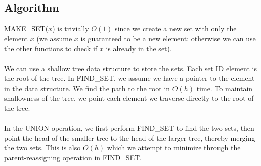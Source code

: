 \documentclass{article}
\begin{document}
\subsection*{Algorithm}
MAKE\_SET($x$) is trivially $O(1)$ since we create a new set with only the element $x$ (we assume $x$ is guaranteed to be a new element; otherwise we can use the other functions to check if $x$ is already in the set).\\
\\
We can use a shallow tree data structure to store the sets. Each set ID element is the root of the tree. In FIND\_SET, we assume we have a pointer to the element in the data structure. We find the path to the root in $O(h)$ time. To maintain shallowness of the tree, we point each element we traverse directly to the root of the tree.\\
\\
In the UNION operation, we first perform FIND\_SET to find the two sets, then point the head of the smaller tree to the head of the larger tree, thereby merging the two sets. This is also $O(h)$ which we attempt to minimize through the parent-reassigning operation in FIND\_SET.
\end{document}
